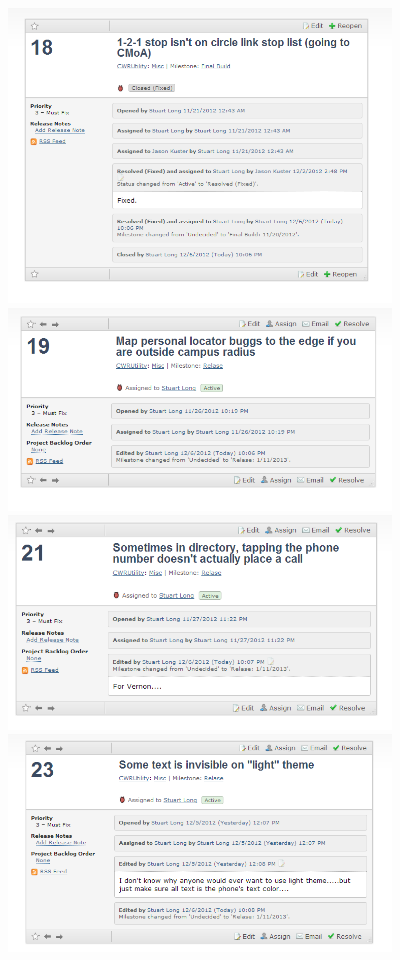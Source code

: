 \documentclass[pdftex,12pt,letter]{article}
\begin{document}
\FloatBarrier
\includegraphics[width=4in]{bugs4.png}
\FloatBarrier
\includegraphics[width=4in]{bugs5.png}
\FloatBarrier
\includegraphics[width=4in]{bugs6.png}
\FloatBarrier
\includegraphics[width=4in]{bugs7.png}
\end{document}

